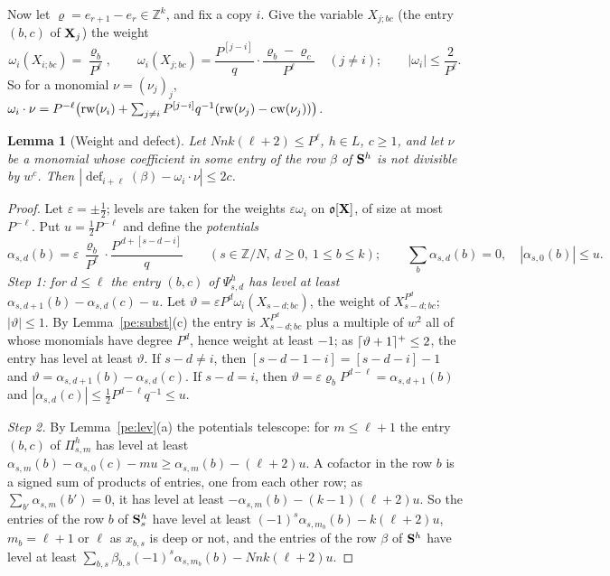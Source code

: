 \documentclass[10pt]{amsart}
\newtheorem{lemma}[theorem]{Lemma}
\theoremstyle{definition}
\theoremstyle{remark}
\newcommand{\Z}{\mathbb Z}
\providecommand{\pao}{\mathfrak o}
\providecommand{\phdef}{\operatorname{def}}
\begin{document}
Now let $\varrho=e_{r+1}-e_r\in\Z^k$, and fix a copy $i$. Give the variable $X_{j;bc}$ (the entry
$(b,c)$ of $\mathbf X_j$) the weight
\[
\omega_i(X_{i;bc})=\frac{\varrho_b}{P^\ell},\qquad\omega_i(X_{j;bc})=\frac{P^{[j-i]}}{q}\cdot
\frac{\varrho_b-\varrho_c}{P^\ell}\quad(j\ne i);\qquad|\omega_i|\le\frac2{P^\ell}.
\]
So for a monomial $\nu=(\nu_j)_j$, $\omega_i\cdot\nu=P^{-\ell}\bigl(\operatorname{rw}(\nu_i)+\sum_{j\ne
i}P^{[j-i]}q^{-1}(\operatorname{rw}(\nu_j)-\operatorname{cw}(\nu_j))\bigr)$.

\begin{lemma}[Weight and defect]\label{pe:wd}
Let $Nnk(\ell+2)\le P^\ell$, $h\in L$, $c\ge1$, and let $\nu$ be a monomial whose coefficient in
some entry of the row $\beta$ of $\mathbf S^h$ is not divisible by $w^c$. Then $|\phdef_{i+\ell}(\beta)
-\omega_i\cdot\nu|\le2c$.
\end{lemma}
\begin{proof}
Let $\varepsilon=\pm\tfrac12$; levels are taken for the weights $\varepsilon\omega_i$ on
$\pao[\peX]$, of size at most $P^{-\ell}$. Put $u=\tfrac12P^{-\ell}$ and define the
\emph{potentials}
\[
\alpha_{s,d}(b)=\varepsilon\,\frac{\varrho_b}{P^\ell}\cdot\frac{P^{\,d+[s-d-i]}}{q}\qquad(s\in\Z/N,\
d\ge0,\ 1\le b\le k);\qquad\sum_b\alpha_{s,d}(b)=0,\quad|\alpha_{s,0}(b)|\le u .
\]
\emph{Step 1: for $d\le\ell$ the entry $(b,c)$ of $\Psi^h_{s,d}$ has level at least
$\alpha_{s,d+1}(b)-\alpha_{s,d}(c)-u$.} Let $\vartheta=\varepsilon P^d\omega_i(X_{s-d;bc})$, the
weight of $X_{s-d;bc}^{P^d}$; $|\vartheta|\le1$. By Lemma~\ref{pe:subst}(c) the entry is
$X_{s-d;bc}^{P^d}$ plus a multiple of $w^2$ all of whose monomials have degree $P^d$, hence weight
at least $-1$; as $\lceil \vartheta+1\rceil^{+}\le2$, the entry has level at least $\vartheta$. If $s-d\ne
i$, then $[s-d-1-i]=[s-d-i]-1$ and $\vartheta=\alpha_{s,d+1}(b)-\alpha_{s,d}(c)$. If $s-d=i$, then
$\vartheta=\varepsilon\varrho_bP^{d-\ell}=\alpha_{s,d+1}(b)$ and $|\alpha_{s,d}(c)|\le\tfrac12
P^{d-\ell}q^{-1}\le u$.

\emph{Step 2.} By Lemma~\ref{pe:lev}(a) the potentials telescope: for $m\le\ell+1$ the entry
$(b,c)$ of $\Pi^h_{s,m}$ has level at least $\alpha_{s,m}(b)-\alpha_{s,0}(c)-mu\ge\alpha_{s,m}(b)-
(\ell+2)u$. A cofactor in the row $b$ is a signed sum of products of entries, one from each other
row; as $\sum_{b'}\alpha_{s,m}(b')=0$, it has level at least $-\alpha_{s,m}(b)-(k-1)(\ell+2)u$. So
the entries of the row $b$ of $\mathbf S^h_s$ have level at least $(-1)^s\alpha_{s,m_b}(b)-k(\ell+2)u$,
$m_b=\ell+1$ or $\ell$ as $x_{b,s}$ is deep or not, and the entries of the row $\beta$ of $\mathbf S^h$
have level at least $\sum_{b,s}\beta_{b,s}(-1)^s\alpha_{s,m_b}(b)-Nnk(\ell+2)u$.


\end{proof}
\end{document}
